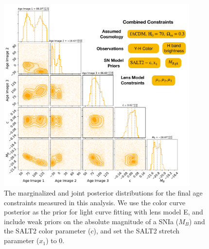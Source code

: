 \documentclass[12pt]{article}
\begin{document}
\begin{figure}
    \centering
    \includegraphics[width=0.9\textwidth]{Paper/Figures/lc_modelH_color_corner_labels.pdf}
    \caption{The marginalized and joint posterior distributions for the final age constraints measured in this analysis. We use the color curve posterior as the prior for light curve fitting with lens model E, and include weak priors on the absolute magnitude of a SNIa ($M_B$) and the SALT2 color parameter ($c$), and set the SALT2 stretch parameter ($x_1$) to 0.}
    \label{fig:corner_combined}
\end{figure}
\end{document}

